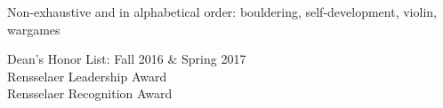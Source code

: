 \documentclass[11pt,a4paper]{article}
\begin{document}




\inlineheadsection
  {Non-exhaustive and in alphabetical order:}
  { bouldering,  self-development, violin, wargames }

\spacedhrule{1.6em}{-0.4em}

  \indent Dean's Honor List: Fall 2016 \& Spring 2017 \\
  \indent Rensselaer Leadership Award \\      
  \indent Rensselaer Recognition Award \\ 
\end{document}
